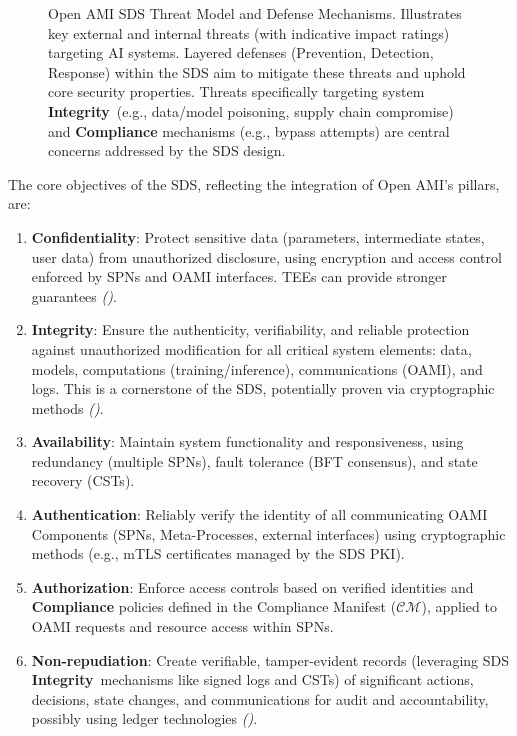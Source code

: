 \documentclass[12pt,a4paper]{report}
\renewcommand{\citep}[1]{\textit{\scriptsize{(\cite{#1})}}}
\newcommand{\Integrity}{\textbf{Integrity}}
\begin{document}
\begin{figure}[ht]
\begin{tikzpicture}
		\end{tikzpicture}
		\caption[Open AMI SDS Threat Model and Defenses]{Open AMI SDS Threat Model and Defense Mechanisms. Illustrates key external and internal threats (with indicative impact ratings) targeting AI systems. Layered defenses (Prevention, Detection, Response) within the SDS aim to mitigate these threats and uphold core security properties. Threats specifically targeting system \Integrity\ (e.g., data/model poisoning, supply chain compromise) and \textbf{Compliance} mechanisms (e.g., bypass attempts) are central concerns addressed by the SDS design.}
		\label{fig:threat-model}
	\end{figure}
	
	The core objectives of the SDS, reflecting the integration of Open AMI's pillars, are:
	\begin{enumerate}[noitemsep]
		\item \textbf{Confidentiality}: Protect sensitive data (parameters, intermediate states, user data) from unauthorized disclosure, using encryption and access control enforced by SPNs and OAMI interfaces. TEEs can provide stronger guarantees \citep{Citadel_PlusPlus_2025}.
		\item \Integrity: Ensure the authenticity, verifiability, and reliable protection against unauthorized modification for all critical system elements: data, models, computations (training/inference), communications (OAMI), and logs. This is a cornerstone of the SDS, potentially proven via cryptographic methods \citep{Peng2025ZKMLSurvey, Jia2021ProofOfLearning}.
		\item \textbf{Availability}: Maintain system functionality and responsiveness, using redundancy (multiple SPNs), fault tolerance (BFT consensus), and state recovery (CSTs).
		\item \textbf{Authentication}: Reliably verify the identity of all communicating OAMI Components (SPNs, Meta-Processes, external interfaces) using cryptographic methods (e.g., mTLS certificates managed by the SDS PKI).
		\item \textbf{Authorization}: Enforce access controls based on verified identities and \textbf{Compliance} policies defined in the Compliance Manifest ($\mathcal{CM}$), applied to OAMI requests and resource access within SPNs.
		\item \textbf{Non-repudiation}: Create verifiable, tamper-evident records (leveraging SDS \Integrity\ mechanisms like signed logs and CSTs) of significant actions, decisions, state changes, and communications for audit and accountability, possibly using ledger technologies \citep{ProML_Provenance_2022}.

\end{enumerate}
\end{document}
